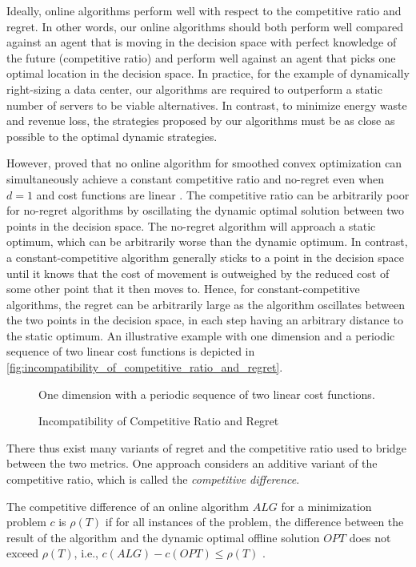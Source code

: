 Ideally, online algorithms perform well with respect to the competitive ratio and regret. In other words, our online algorithms should both perform well compared against an agent that is moving in the decision space with perfect knowledge of the future (competitive ratio) and perform well against an agent that picks one optimal location in the decision space. In practice, for the example of dynamically right-sizing a data center, our algorithms are required to outperform a static number of servers to be viable alternatives. In contrast, to minimize energy waste and revenue loss, the strategies proposed by our algorithms must be as close as possible to the optimal dynamic strategies.

However, \citeauthor*{Andrew2015} proved that no online algorithm for smoothed convex optimization can simultaneously achieve a constant competitive ratio and no-regret even when $d = 1$ and cost functions are linear \cite{Andrew2015}. The competitive ratio can be arbitrarily poor for no-regret algorithms by oscillating the dynamic optimal solution between two points in the decision space. The no-regret algorithm will approach a static optimum, which can be arbitrarily worse than the dynamic optimum. In contrast, a constant-competitive algorithm generally sticks to a point in the decision space until it knows that the cost of movement is outweighed by the reduced cost of some other point that it then moves to. Hence, for constant-competitive algorithms, the regret can be arbitrarily large as the algorithm oscillates between the two points in the decision space, in each step having an arbitrary distance to the static optimum. An illustrative example with one dimension and a periodic sequence of two linear cost functions is depicted in \autoref{fig:incompatibility_of_competitive_ratio_and_regret}.

\begin{figure}
    \centering
    [TODO]

    One dimension with a periodic sequence of two linear cost functions.
    \caption{Incompatibility of Competitive Ratio and Regret}
    \label{fig:incompatibility_of_competitive_ratio_and_regret}
\end{figure}

There thus exist many variants of regret and the competitive ratio used to bridge between the two metrics. One approach considers an additive variant of the competitive ratio, which is called the \emph{competitive difference}.

\begin{definition}
The competitive difference of an online algorithm $ALG$ for a minimization problem $c$ is $\rho(T)$ if for all instances of the problem, the difference between the result of the algorithm and the dynamic optimal offline solution $OPT$ does not exceed $\rho(T)$, i.e., $c(ALG) - c(OPT) \leq \rho(T)$ \cite{Chen2015}.
\end{definition}

